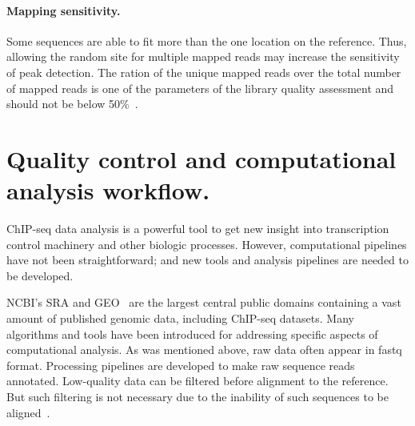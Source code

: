 \paragraph{Mapping sensitivity.}
Some sequences are able to fit more than the one location on the reference. Thus, allowing the random site for multiple mapped reads may increase the sensitivity of peak detection. 
The ration of the unique mapped reads over the total number of mapped reads is one of the parameters of the library quality assessment and should not be below 50\%~\cite{shin2013computational}.













\section{Quality control and computational analysis workflow.}


ChIP-seq data analysis is a powerful tool to get new insight into transcription control machinery and other biologic processes. 
However, computational pipelines have not been straightforward; 
and new tools and analysis pipelines are needed to be developed.

NCBI's SRA and GEO~\cite{barrett2012ncbi} are the largest central public domains containing a vast amount of published genomic data, including ChIP-seq datasets. 
Many algorithms and tools have been introduced for addressing specific aspects of computational analysis. 
As was mentioned above, raw data often appear in fastq format. 
Processing pipelines are developed to make raw sequence reads annotated.
Low-quality data can be filtered before alignment to the reference. 
But such filtering is not necessary due to the inability of such sequences to be aligned~\cite{furey2012chip}.


